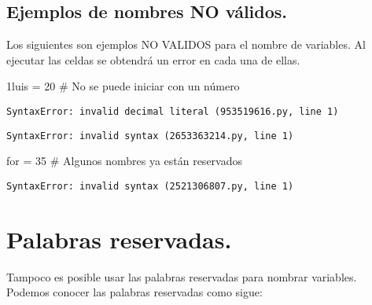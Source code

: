 \documentclass[
  letterpaper,
  DIV=11,
  numbers=noendperiod]{scrreprt}
\newenvironment{Shaded}{\begin{snugshade}}{\end{snugshade}}
\newcommand{\CommentTok}[1]{\textcolor[rgb]{0.37,0.37,0.37}{#1}}
\newcommand{\ControlFlowTok}[1]{\textcolor[rgb]{0.00,0.23,0.31}{#1}}
\newcommand{\DecValTok}[1]{\textcolor[rgb]{0.68,0.00,0.00}{#1}}
\newcommand{\ErrorTok}[1]{\textcolor[rgb]{0.68,0.00,0.00}{#1}}
\newcommand{\FloatTok}[1]{\textcolor[rgb]{0.68,0.00,0.00}{#1}}
\newcommand{\NormalTok}[1]{\textcolor[rgb]{0.00,0.23,0.31}{#1}}
\newcommand{\OperatorTok}[1]{\textcolor[rgb]{0.37,0.37,0.37}{#1}}
\begin{document}
\subsection{\texorpdfstring{\textbf{Ejemplos de nombres NO
válidos.}}{Ejemplos de nombres NO válidos.}}\label{ejemplos-de-nombres-no-vuxe1lidos.}

Los siguientes son ejemplos NO VALIDOS para el nombre de variables. Al
ejecutar las celdas se obtendrá un error en cada una de ellas.

\begin{Shaded}
\begin{Highlighting}[]
\DecValTok{1l}\ErrorTok{uis} \OperatorTok{=} \DecValTok{20}      \CommentTok{\# No se puede iniciar con un número}
\end{Highlighting}
\end{Shaded}

\begin{verbatim}
SyntaxError: invalid decimal literal (953519616.py, line 1)
\end{verbatim}

\begin{Shaded}
\end{Shaded}

\begin{verbatim}
SyntaxError: invalid syntax (2653363214.py, line 1)
\end{verbatim}

\begin{Shaded}
\begin{Highlighting}[]
\ControlFlowTok{for} \OperatorTok{=} \DecValTok{35}        \CommentTok{\# Algunos nombres ya están reservados}
\end{Highlighting}
\end{Shaded}

\begin{verbatim}
SyntaxError: invalid syntax (2521306807.py, line 1)
\end{verbatim}

\section{Palabras reservadas.}\label{palabras-reservadas.}

Tampoco es posible usar las palabras reservadas para nombrar variables.
Podemos conocer las palabras reservadas como sigue:
\end{document}
